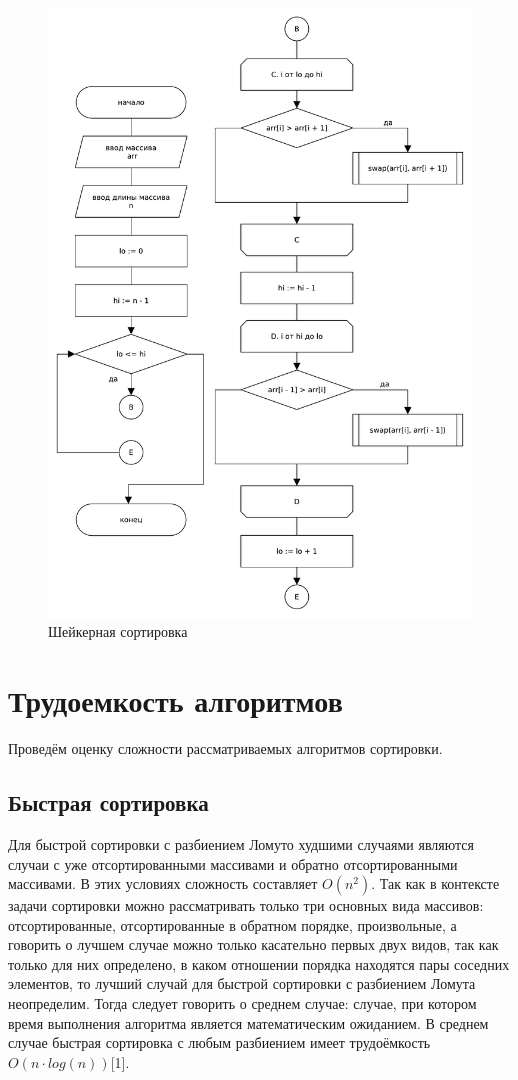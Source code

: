 \begin{figure}[H]
    \centering
    \includegraphics[scale=0.65]{./pdf/shakersort.pdf}
    \caption{Шейкерная сортировка}
    \label{img:shs}
\end{figure}

\section{Трудоемкость алгоритмов}
Проведём оценку сложности рассматриваемых алгоритмов сортировки.

\subsection{Быстрая сортировка}
Для быстрой сортировки с разбиением Ломуто худшими случаями являются случаи с уже отсортированными массивами и обратно отсортированными массивами. В этих условиях сложность составляет $O(n^2)$\cite{knuth}. Так как в контексте задачи сортировки можно рассматривать только три основных вида массивов: отсортированные, отсортированные в обратном порядке, произвольные, а говорить о лучшем случае можно только касательно первых двух видов, так как только для них определено, в каком отношении порядка находятся пары соседних элементов, то лучший случай для быстрой сортировки с разбиением Ломута неопределим. Тогда следует говорить о среднем случае: случае, при котором время выполнения алгоритма является математическим ожиданием. В среднем случае быстрая сортировка с любым разбиением имеет трудоёмкость $O(n\cdot{}log(n))$[1].

